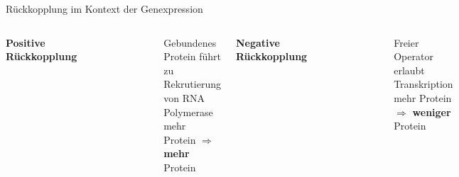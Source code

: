 \documentclass[11pt,aspectratio=169,reqno]{beamer}
\begin{document}
\begin{frame}{Rückkopplung im Kontext der Genexpression}
\begin{columns}
    \centering
    \textbf{Positive Rückkopplung}
    \begin{figure}
        \includegraphics[width=.6\textwidth]{images/dna_positive_autoregulation.png}
    \end{figure}

    Gebundenes Protein führt zu Rekrutierung von RNA Polymerase\\[1em]
    mehr Protein $\Rightarrow$ \textbf{mehr} Protein
    \vspace{1em}

    
    \centering
    \textbf{Negative Rückkopplung}
    \begin{figure}
        \includegraphics[width=.6\textwidth]{images/dna_negative_autoregulation.png}
    \end{figure}
    Freier Operator erlaubt Transkription\\[2em]
    mehr Protein $\Rightarrow$ \textbf{weniger} Protein
    \vspace{1em}


\end{columns}
\end{frame}
\end{document}
